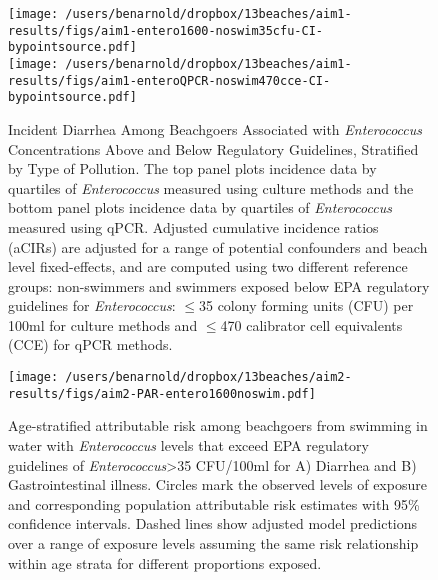 \documentclass[11pt]{article}
\begin{document}
\begin{figure}[htbp]
\begin{center}
\texttt{[image: /users/benarnold/dropbox/13beaches/aim1-results/figs/aim1-entero1600-noswim35cfu-CI-bypointsource.pdf]} \\
\texttt{[image: /users/benarnold/dropbox/13beaches/aim1-results/figs/aim1-enteroQPCR-noswim470cce-CI-bypointsource.pdf]} 
\begin{minipage}{0.9\textwidth}
\caption{Incident Diarrhea Among Beachgoers Associated with \textit{Enterococcus} Concentrations Above and Below Regulatory Guidelines, Stratified by Type of Pollution. The top panel plots incidence data by quartiles of \textit{Enterococcus} measured using culture methods and the bottom panel plots incidence data by quartiles of \textit{Enterococcus} measured using qPCR.   Adjusted cumulative incidence ratios (aCIRs) are adjusted for a range of potential confounders and beach level fixed-effects, and are computed using two different reference groups: non-swimmers and swimmers exposed below EPA regulatory guidelines for \textit{Enterococcus}: $\leq$35 colony forming units (CFU) per 100ml for culture methods and $\leq$470 calibrator cell equivalents (CCE) for qPCR methods.}
\label{fig:enteroregulatory}
\end{minipage}
\end{center}
\end{figure}


\begin{figure}[htbp]
\begin{center}
\texttt{[image: /users/benarnold/dropbox/13beaches/aim2-results/figs/aim2-PAR-entero1600noswim.pdf]} 
\begin{minipage}{0.5\textwidth}
\caption{Age-stratified attributable risk among beachgoers from swimming in water with \textit{Enterococcus} levels that exceed EPA regulatory guidelines of \textit{Enterococcus}>35 CFU/100ml for A) Diarrhea and B) Gastrointestinal illness.  Circles mark the observed levels of exposure and corresponding population attributable risk estimates with 95\% confidence intervals. Dashed lines show adjusted model predictions over a range of exposure levels assuming the same risk relationship within age strata for different proportions exposed.}
\label{fig:enteroPAR}
\end{minipage}
\end{center}
\end{figure}
\end{document}
